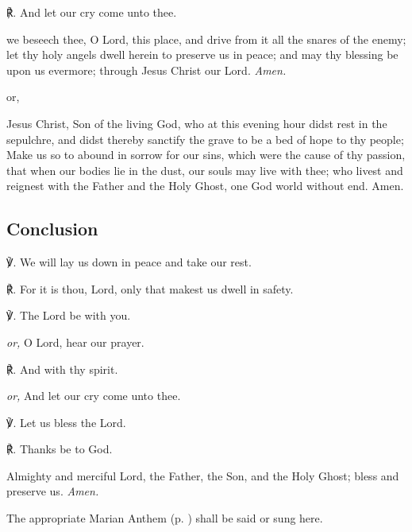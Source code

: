 \begin{multicols}{2}
℟. And let our cry come unto thee.

{} we beseech thee, O Lord, this place, and drive from it all the snares of the enemy; let thy holy angels dwell herein to preserve us in peace; and may thy blessing be upon us evermore; through Jesus Christ our Lord. \textit{Amen.}

\begin{inhead}
	or,
\end{inhead}

 Jesus Christ, Son of the living God, who at this evening hour didst rest in the sepulchre, and didst thereby sanctify the grave to be a bed of hope to thy people; Make us so to abound in sorrow for our sins, which were the cause of thy passion, that when our bodies lie in the dust, our souls may live with thee; who livest and reignest with the Father and the Holy Ghost, one God world without end. Amen.


\subsection{Conclusion}
℣. We will lay us down in peace and take our rest.\par
℟. For it is thou, Lord, only that makest us dwell in safety.\par
℣. The Lord be with you.\par
\textit{or,} O Lord, hear our prayer.\par
℟. And with thy spirit.\par
\textit{or,} And let our cry come unto thee.\par
℣. Let us bless the Lord.\par
℟. Thanks be to God.

 Almighty and merciful Lord, the Father, {} the Son, and the Holy Ghost; bless and preserve us. \textit{Amen.}

\begin{rubric}
	{The appropriate Marian Anthem (p. \pageref{Mary}) shall be said or sung here.}
 \end{rubric}
 
 \end{multicols}
